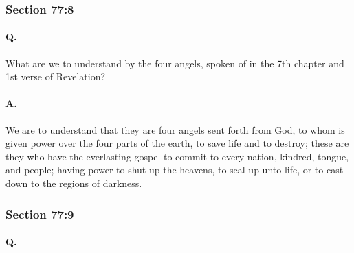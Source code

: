 
	\subsubsection{Section 77:8} %
		\label{DC77-8}

		\paragraph{Q.}

			What are we to understand by the four angels, spoken of in the 7th chapter and 1st verse of Revelation?

		\paragraph{A.}
		
			We are to understand that they are four angels sent forth from God, to whom is given power over the four parts of the earth, to save life and to destroy; these are they who have the everlasting gospel to commit to every nation, kindred, tongue, and people; having power to shut up the heavens, to seal up unto life, or to cast down to the regions of darkness.


	\subsubsection{Section 77:9} %
		\label{DC77-9}

		\paragraph{Q.}
		
